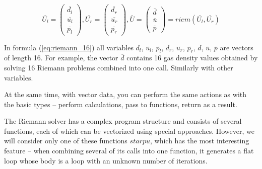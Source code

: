 \documentclass[
11pt,%
tightenlines,%
twoside,%
onecolumn,%
nofloats,%
nobibnotes,%
nofootinbib,%
superscriptaddress,%
noshowpacs,%
centertags]%
{revtex4}
\begin{document}
\begin{equation}\label{eq:riemann_16}
\overline{U_l} = \left( \begin{array}{ccc} \overline{d_l} \\ \overline{u_l} \\ \overline{p_l} \end{array} \right),
\overline{U_r} = \left( \begin{array}{ccc} \overline{d_r} \\ \overline{u_r} \\ \overline{p_r} \end{array} \right),
\overline{U} = \left( \begin{array}{ccc} \overline{d} \\ \overline{u} \\ \overline{p} \end{array} \right) = riem(\overline{U_l}, \overline{U_r})
\end{equation}

In formula (\ref{eq:riemann_16}) all variables $\overline{d_l}$, $\overline{u_l}$, $\overline{p_l}$, $\overline{d_r}$, $\overline{u_r}$, $\overline{p_r}$, $\overline{d}$, $\overline{u}$, $\overline{p}$ are vectors of length 16.
For example, the vector $\overline{d}$ contains 16 gas density values obtained by solving 16 Riemann problems combined into one call.
Similarly with other variables.

At the same time, with vector data, you can perform the same actions as with the basic types -- perform calculations, pass to functions, return as a result.

The Riemann solver has a complex program structure and consists of several functions, each of which can be vectorized using special approaches.
However, we will consider only one of these functions $starpu$, which has the most interesting feature -- when combining several of its calls into one function, it generates a flat loop whose body is a loop with an unknown number of iterations.
\end{document}
